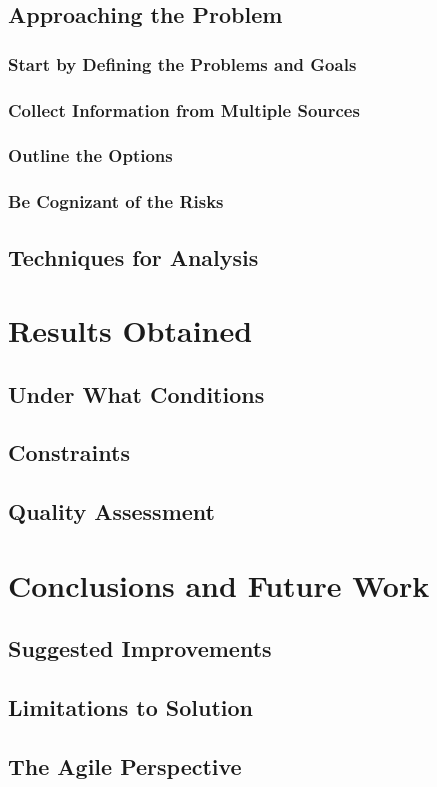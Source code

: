 \documentclass[a4paper,12pt]{report}
\begin{document}
\section{Approaching the Problem}
\subsection{Start by Defining the Problems and Goals}
\subsection{Collect Information from Multiple Sources}
\subsection{Outline the Options}
\subsection{Be Cognizant of the Risks}
\section{Techniques for Analysis}

\chapter{Results Obtained}
\section{Under What Conditions}
\section{Constraints}
\section{Quality Assessment}

\chapter{Conclusions and Future Work}
\section{Suggested Improvements}
\section{Limitations to Solution}
\section{The Agile Perspective}
\end{document}
